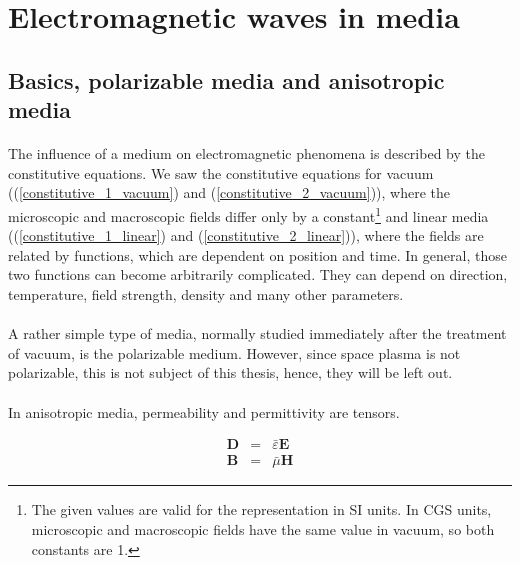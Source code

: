 \documentclass[a4paper,10pt]{thesis}
\begin{document}
\section{\textbf{Electromagnetic waves in media}}
\subsection{Basics, polarizable media and anisotropic media}
\paragraph*{}
The influence of a medium on electromagnetic phenomena is described by the constitutive equations. We saw the constitutive equations for vacuum ((\ref{constitutive_1_vacuum}) and (\ref{constitutive_2_vacuum})), where the microscopic and macroscopic fields differ only by a constant\footnote{The given values are valid for the representation in SI units. In CGS units, microscopic and macroscopic fields have the same value in vacuum, so both constants are 1.} and linear media ((\ref{constitutive_1_linear}) and (\ref{constitutive_2_linear})), where the fields are related by functions, which are dependent on position and time. In general, those two functions can become arbitrarily complicated. They can depend on direction, temperature, field strength, density and many other parameters.

\paragraph*{}
A rather simple type of media, normally studied immediately after the treatment of vacuum, is the polarizable medium. However, since space plasma is not polarizable, this is not subject of this thesis, hence, they will be left out.

\paragraph*{}
In anisotropic media, permeability and permittivity are tensors.

\begin{eqnarray}
\mathbf{D} &=& \bar{\varepsilon}  \mathbf{E} \label{constitutive_1_unisotrop} \\
\mathbf{B} &=& \bar{\mu} \mathbf{H} \label{constitutive_2_unisotrop}
\end{eqnarray}
\end{document}
